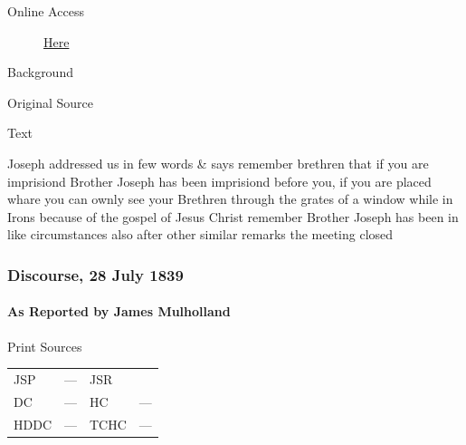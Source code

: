 				\begin{description}
					\item[Online Access] \href{https://www.josephsmithpapers.org/paper-summary/discourse-7-july-1839-as-reported-by-wilford-woodruff/1}{Here}
				\end{description}
				
				\begin{description}
					\item[Background]
				\end{description}
				
				
				\begin{description}
					\item[Original Source]
				\end{description}
				
				
				\begin{description}
					\item[Text]
				\end{description}
				
					Joseph addressed us in few words \& says remember brethren that if you are imprisiond Brother Joseph has been imprisiond before you, if you are placed whare you can ownly see your Brethren through the grates of a window while in Irons because of the gospel of Jesus Christ remember Brother Joseph has been in like circumstances also after other similar remarks the meeting closed
					
		\subsubsection{Discourse, 28 July 1839}
			\label{EMS-1839-JS-28-JUL-1839}
			
			\paragraph{As Reported by James Mulholland}
				\label{EMS-1839-JS-28-JUL-1839-JM}
				
				\begin{description}
					\item[Print Sources]
				\end{description}

					\begin{tabular}{p{0.5in}p{1in}p{0.5in}p{1in}}
					JSP	 	& ---		& JSR 		&  \\
					DC	 	& ---		& HC 		& --- \\
					HDDC 	& ---		& TCHC 		& --- \\
					\end{tabular}
				
